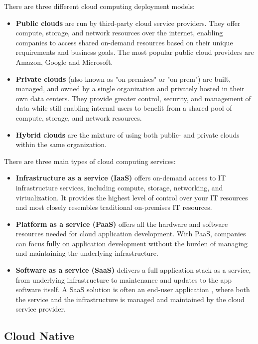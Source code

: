 	There are three different cloud computing deployment models:
	\begin{itemize}
		\item \textbf{Public clouds} are run by third-party cloud service providers. They offer compute, storage, and network resources over the internet, 
		enabling companies to access shared on-demand resources based on their unique requirements and business goals.
		The most popular public cloud providers are Amazon, Google and Microsoft.
		\item \textbf{Private clouds} (also known as "on-premises" or "on-prem") are built, managed, and owned by a single organization 
		and privately hosted in their own data centers.
		They provide greater control, security, and management of data while still 
		enabling internal users to benefit from a shared pool of compute, storage, and network resources.
		\item \textbf{Hybrid clouds} are the mixture of using both public- and private clouds within the same organization.
	\end{itemize}

	There are three main types of cloud computing services:
	\begin{itemize}
		\item \textbf{Infrastructure as a service (IaaS)} offers on-demand access to IT infrastructure services, 
		including compute, storage, networking, and virtualization. It provides the highest level of control over your IT 
		resources and most closely resembles traditional on-premises IT resources.
		\item \textbf{Platform as a service (PaaS)} offers all the hardware and software resources needed for cloud 
		application development. With PaaS, companies can focus fully on application development without 
		the burden of managing and maintaining the underlying infrastructure.
		\item \textbf{Software as a service (SaaS)} delivers a full application stack as a service, from underlying 
		infrastructure to maintenance and updates to the app software itself. A SaaS solution is often an end-user application
		, where both the service and the infrastructure is managed and maintained by the cloud service provider.
	\end{itemize}

\subsection{Cloud Native}


